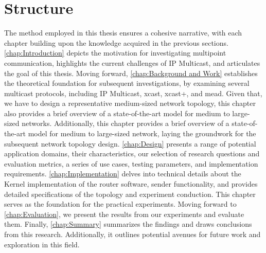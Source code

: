 \section{Structure} %
\label{sec:Structure}
The method employed in this thesis ensures a cohesive narrative, with each
    chapter building upon the knowledge acquired in the previous sections.
\autoref{chap:Introduction} depicts the motivation for investigating multipoint
    communication, highlights the current challenges of IP Multicast, and
    articulates the goal of this thesis.
Moving forward, \autoref{chap:Background and Work} establishes the theoretical
    foundation for subsequent investigations, by examining several multicast
    protocols, including IP Multicast, \gls{xcast}, \gls{xcast+}, and \gls{mead}.
Given that, we have to design a representative medium-sized network topology,
    this chapter also provides a brief overview of a state-of-the-art 
    model for medium to large-sized networks.
Additionally, this chapter  provides a brief overview of a state-of-the-art
    model for medium to large-sized network, laying the groundwork for the 
    subsequent network topology design.
\autoref{chap:Design} presents a range of potential application domains, their
    characteristics, our selection of research questions and evaluation metrics,
    a series of use cases, testing parameters, and implementation requirements.
\autoref{chap:Implementation} delves into technical details about the Kernel
    implementation of the router software, sender functionality, and provides detailed
    specifications of the topology and experiment conduction.
This chapter serves as the foundation for the practical experiments.
Moving forward to \autoref{chap:Evaluation}, we present the results from our
    experiments and evaluate them.
Finally, \autoref{chap:Summary} summarizes the findings and draws conclusions
    from this research.
Additionally, it outlines potential avenues for future work and exploration in
    this field.

